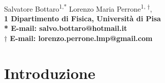 \documentclass[10pt,letterpaper]{article}
\date{15.03.16}
\begin{document}
\vspace*{0.30in}

\begin{flushleft}
{\Large
\textbf{}
}
\newline
\\
Salvatore Bottaro\textsuperscript{1,*}
Lorenzo Maria Perrone\textsuperscript{1, $\dagger$},
\\
\bf{1} Dipartimento di Fisica, Università di Pisa
\\

% 
%




* E-mail: salvo.bottaro@hotmail.it\\
$\dagger$ E-mail: lorenzo.perrone.lmp@gmail.com
\end{flushleft}


\section{Introduzione}
\end{document}

